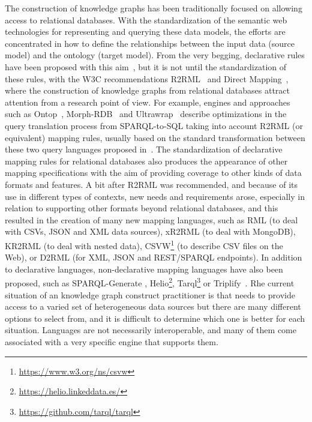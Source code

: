 The construction of knowledge graphs has been traditionally focused on allowing access to relational databases. With the standardization of the semantic web technologies for representing and querying these data models, the efforts are concentrated in how to define the relationships between the input data (source model) and the ontology (target model). From the very begging, declarative rules have been proposed with this aim~\citep{barrasa2004r2o}, but it is not until the standardization of these rules, with the W3C recommendations R2RML~\citep{R2RML} and Direct Mapping~\citep{arenas2013direct}, where the construction of knowledge graphs from relational databases attract attention from a research point of view. For example, engines and approaches such as Ontop~\citep{calvanese2017ontop}, Morph-RDB~\citep{priyatna2014formalisation} and Ultrawrap~\citep{sequeda2013ultrawrap} describe optimizations in the query translation process from SPARQL-to-SQL taking into account R2RML (or equivalent) mapping rules, usually based on the standard transformation between these two query languages proposed in~\citep{chebotko2009semantics}. The standardization of declarative mapping rules for relational databases also produces the appearance of other mapping specifications with the aim of providing coverage to other kinds of data formats and features. A bit after R2RML was recommended, and because of its use in different types of contexts, new needs and requirements arose, especially in relation to supporting other formats beyond relational databases, and this resulted in the creation of many new mapping languages, such as RML \citep{dimou2014rml} (to deal with CSVs, JSON and XML data sources), xR2RML \citep{michel2015translation} (to deal with MongoDB), KR2RML \citep{slepicka2015kr2rml} (to deal with nested data), CSVW\footnote{\url{https://www.w3.org/ns/csvw}} (to describe CSV files on the Web), or D2RML \citep{chortaras2018d2rml} (for XML, JSON and REST/SPARQL endpoints). In addition to declarative languages, non-declarative mapping languages have also been proposed, such as SPARQL-Generate \citep{lefranccois2017sparql}, Helio\footnote{\url{https://helio.linkeddata.es/}},  Tarql\footnote{\url{https://github.com/tarql/tarql}} or Triplify~\citep{auer2009triplify}. Rhe current situation of an knowledge graph construct practitioner is that needs to provide access to a varied set of heterogeneous data sources but there are many different options to select from, and it is difficult to determine which one is better for each situation. Languages are not necessarily interoperable, and many of them come associated with a very specific engine that supports them.

